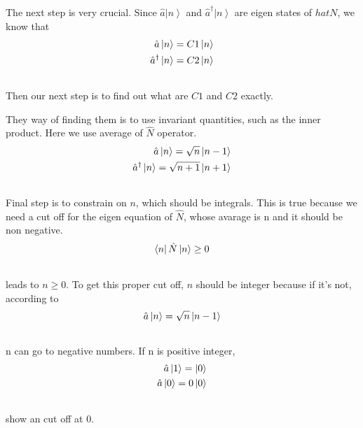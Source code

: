 \documentclass[letterpaper,10pt,english]{sphinxmanual}
\newcommand{\bra}[1]{\left\langle #1\right|}
\newcommand{\ket}[1]{\left| #1\right\rangle}
\begin{document}
The next step is very crucial. Since $\hat a \ket{n}$ and $\hat a^\dagger \ket{n}$ are eigen states of $hat N$, we know that
\begin{gather}
\begin{split}\hat a \ket{n} = C1 \ket{n} \\
\hat a^\dagger \ket{n} = C2 \ket{n}\end{split}\notag\\\begin{split}\end{split}\notag
\end{gather}
Then our next step is to find out what are $C1$ and $C2$ exactly.

They way of finding them is to use invariant quantities, such as the inner product. Here we use average of $\hat N$ operator.
\begin{gather}
\begin{split}\hat a \ket{n} = \sqrt n \ket{n-1}  \\
\hat a^\dagger \ket{n} = \sqrt{n+1} \ket{n+1}\end{split}\notag\\\begin{split}\end{split}\notag
\end{gather}
Final step is to constrain on $n$, which should be integrals. This is true because we need a cut off for the eigen equation of $\hat N$, whose avarage is n and it should be non negative.
\begin{gather}
\begin{split}\bra{n}\hat N \ket{n} \ge 0\end{split}\notag\\\begin{split}\end{split}\notag
\end{gather}
leads to $n\ge 0$. To get this proper cut off, $n$ should be integer because if it's not, according to
\begin{gather}
\begin{split}\hat a \ket{n} = \sqrt n \ket{n-1}\end{split}\notag\\\begin{split}\end{split}\notag
\end{gather}
n can go to negative numbers. If n is positive integer,
\begin{gather}
\begin{split}\hat a \ket{1} = \ket{0}  \\
\hat a \ket{0} = 0 \ket{0}\end{split}\notag\\\begin{split}\end{split}\notag
\end{gather}
show an cut off at 0.
\end{document}
